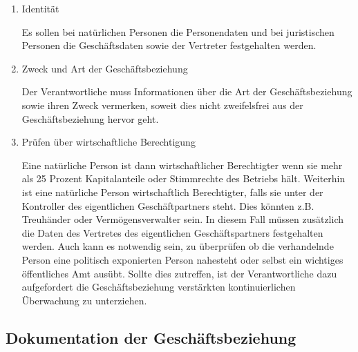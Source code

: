 \documentclass{article}
\begin{document}
        \begin{enumerate}

            \item Identität

                Es sollen bei natürlichen Personen die Personendaten und bei juristischen Personen die Geschäftsdaten sowie der Vertreter festgehalten werden.

            \item Zweck und Art der Geschäftsbeziehung

                Der Verantwortliche muss Informationen über die Art der Geschäftsbeziehung sowie ihren Zweck vermerken, soweit dies nicht zweifelsfrei aus der Geschäftsbeziehung hervor geht.


            \item Prüfen über wirtschaftliche Berechtigung

                Eine natürliche Person ist dann wirtschaftlicher Berechtigter wenn sie mehr als 25 Prozent Kapitalanteile oder Stimmrechte des Betriebs hält.
                Weiterhin ist eine natürliche Person wirtschaftlich Berechtigter, falls sie unter der Kontroller des eigentlichen Geschäftpartners steht. Dies könnten z.B. Treuhänder oder Vermögensverwalter sein. In diesem Fall müssen zusätzlich die Daten des Vertretes des eigentlichen Geschäftspartners festgehalten werden.
                Auch kann es notwendig sein, zu überprüfen ob die verhandelnde Person eine politisch exponierten Person nahesteht oder selbst ein wichtiges öffentliches Amt ausübt. Sollte dies zutreffen, ist der Verantwortliche dazu aufgefordert die Geschäftsbeziehung verstärkten kontinuierlichen Überwachung zu unterziehen.

        \end{enumerate}           


        \subsection[Dokumentation der Geschäftsbeziehung]{Dokumentation der Geschäftsbeziehung}
\end{document}
